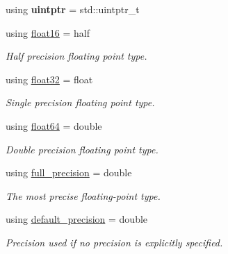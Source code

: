 \begin{DoxyCompactItemize}
\mbox{\label{namespacegko_a0913bfb81622f6bdde52884015c2a4ed}} 
using {\bfseries uintptr} = std\+::uintptr\+\_\+t
\item 
\mbox{\label{namespacegko_a86477c0acba18c50cac69112d791dfa6}} 
using \hyperlink{namespacegko_a86477c0acba18c50cac69112d791dfa6}{float16} = half
\begin{DoxyCompactList}\small\item\em Half precision floating point type. \end{DoxyCompactList}\item 
\mbox{\label{namespacegko_a0b5dbd886493d4ccaba6a7a1ba74896c}} 
using \hyperlink{namespacegko_a0b5dbd886493d4ccaba6a7a1ba74896c}{float32} = float
\begin{DoxyCompactList}\small\item\em Single precision floating point type. \end{DoxyCompactList}\item 
\mbox{\label{namespacegko_a75c7a433d814b8b37d0bc2a9c57fbe65}} 
using \hyperlink{namespacegko_a75c7a433d814b8b37d0bc2a9c57fbe65}{float64} = double
\begin{DoxyCompactList}\small\item\em Double precision floating point type. \end{DoxyCompactList}\item 
\mbox{\label{namespacegko_ae3257beda99ac9180b501912be5caa5f}} 
using \hyperlink{namespacegko_ae3257beda99ac9180b501912be5caa5f}{full\+\_\+precision} = double
\begin{DoxyCompactList}\small\item\em The most precise floating-\/point type. \end{DoxyCompactList}\item 
\mbox{\label{namespacegko_a1d44e117d2f74b34bdc83ac5c0c6b605}} 
using \hyperlink{namespacegko_a1d44e117d2f74b34bdc83ac5c0c6b605}{default\+\_\+precision} = double
\begin{DoxyCompactList}\small\item\em Precision used if no precision is explicitly specified. \end{DoxyCompactList}\end{DoxyCompactItemize}
